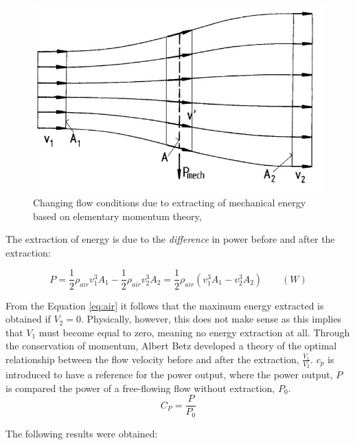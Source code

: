 \begin{figure}[H]
\centering
\includegraphics[scale=0.6]{figures/flow}
\caption[$\; \:$Changing flow conditions due to extracting of mechanical]{Changing flow conditions due to extracting of mechanical energy based on elementary momentum theory, \cite{Hau2013} }
 \label{fig:flow}
\end{figure}

\noindent The extraction of energy is due to the \textit{difference} in power before and after the extraction: 

\begin{equation}
    P = \frac{1}{2}\rho_{air} v^3_1 A_1 - \frac{1}{2}\rho_{air} v^3_2 A_2 =\frac{1}{2}\rho_{air}( v^3_1 A_1 - v^3_2 A_2) \qquad (W)
    \label{eq:air}
\end{equation}

\noindent From the Equation \ref{eq:air} it follows that the maximum energy extracted is obtained if $V_2=0$. Physically, however, this does not make sense as this implies that $V_1$ must become equal to zero, meaning no energy extraction at all. Through the conservation of momentum, Albert Betz developed a theory of the optimal relationship between the flow velocity before and after the extraction, $\frac{V_1}{V_2}$. $c_p$ is introduced to have a reference for the power output, where the power output, $P$  is compared the power of a free-flowing flow without extraction, $P_0$. 
  \begin{equation}
    C_P = \frac{P}{P_0}
\end{equation}

\noindent The following results were obtained: 

